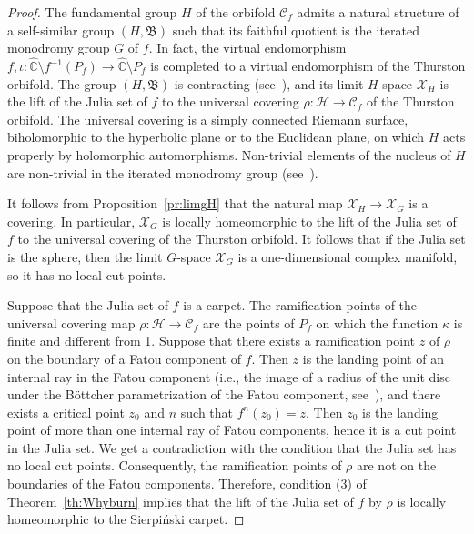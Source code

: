 \documentclass[11pt]{amsart}
\newcommand{\bim}{\mathfrak{B}}
\newcommand{\arr}{\longrightarrow}
\newcommand{\limg}[1][G]{\mathcal{X}_{#1}}
\theoremstyle{definition}
\theoremstyle{plain}
\newtheorem{main thm}{Theorem}
\theoremstyle{remark}
\theoremstyle{plain}
\begin{document}
\begin{proof}
The fundamental group $H$ of the orbifold $\mathcal{C}_f$ admits a natural structure of a self-similar group $(H, \bim)$ such that its faithful quotient is the iterated monodromy group $G$ of $f$. In fact, the virtual endomorphism $f, \iota\colon\widehat{\mathbb{C}}\setminus f^{-1}(P_f)\arr \widehat{\mathbb{C}}\setminus P_f$ is completed to a virtual endomorphism of the Thurston orbifold. The group $(H, \bim)$ is contracting (see~\cite[\S4.7.1]{nek:dyngroups}), and its limit $H$-space $\limg[H]$ is the lift of the Julia set of $f$ to the universal covering $\rho\colon\mathcal{H}\arr\mathcal{C}_f$ of the Thurston orbifold. The universal covering is a simply connected Riemann surface, biholomorphic to the hyperbolic plane or to the Euclidean plane, on which $H$ acts properly by holomorphic automorphisms. Non-trivial elements of the nucleus of $H$ are non-trivial in the iterated monodromy group (see~\cite[Proposition~4.7.3]{nek:dyngroups}).

It follows from Proposition~\ref{pr:limgH} that the natural map $\limg[H]\arr\limg$ is a covering. In particular, $\limg$ is locally homeomorphic to the lift of the Julia set of $f$ to the universal covering of the Thurston orbifold. It follows that if the Julia set is the sphere, then the limit $G$-space $\limg$ is a one-dimensional complex manifold, so it has no local cut points. 

Suppose that the Julia set of $f$ is a carpet. The ramification points of the universal covering map $\rho\colon\mathcal{H}\arr\mathcal{C}_f$ are the points of $P_f$ on which the function $\kappa$ is finite and different from 1. Suppose that there exists a ramification point $z$ of $\rho$ on the boundary of a Fatou component of $f$. Then $z$ is the landing point of an internal ray in the Fatou component (i.e., the image of a radius of the unit disc under the B\"ottcher parametrization of the Fatou component, see~\cite[\S9]{milnor:complexdynamics}), and there exists a critical point $z_0$ and $n$ such that $f^n(z_0)=z$. Then $z_0$ is the landing point of more than one internal ray of Fatou components, hence it is a cut point in the Julia set. We get a contradiction with the condition that the Julia set has no local cut points. Consequently, the ramification points of $\rho$ are not on the boundaries of the Fatou components. Therefore, condition (3) of Theorem~\ref{th:Whyburn} implies that the lift of the Julia set of $f$ by $\rho$ is locally homeomorphic to the Sierpi\'nski carpet.
\end{proof}
\end{document}
